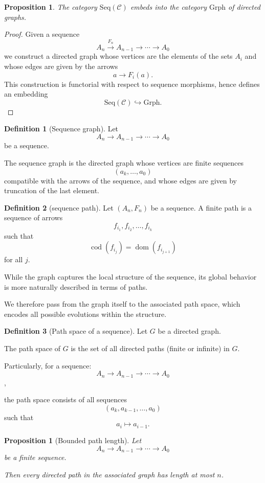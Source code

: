 \documentclass[11pt]{book}
\theoremstyle{definition}
\newtheorem{definition}{Definition}[section]
\theoremstyle{plain}
\newtheorem{proposition}[theorem]{Proposition}
\theoremstyle{remark}
\begin{document}
\begin{proposition}
The category $\mathrm{Seq}(\mathcal C)$ embeds into the category
$\mathrm{Grph}$ of directed graphs.
\end{proposition}

\begin{proof}
Given a sequence
\[
A_n \xrightarrow{F_n} A_{n-1} \to \cdots \to A_0
\]
we construct a directed graph whose vertices are the elements
of the sets $A_i$ and whose edges are given by the arrows
\[
a \to F_i(a).
\]
This construction is functorial with respect to sequence morphisms,
hence defines an embedding
\[
\mathrm{Seq}(\mathcal C) \hookrightarrow \mathrm{Grph}.
\]
\end{proof}

\begin{definition}[Sequence graph]
Let
\[
A_n \to A_{n-1} \to \cdots \to A_0
\]
be a sequence.

The sequence graph is the directed graph whose vertices
are finite sequences
\[
(a_k,\dots,a_0)
\]
compatible with the arrows of the sequence, and whose edges
are given by truncation of the last element.
\end{definition}

\begin{definition}[sequence path]
Let $(A_n,F_n)$ be a sequence.
A finite path is a sequence of arrows
\[
f_{i_1},f_{i_2},\dots,f_{i_k}
\]
such that
\[
\operatorname{cod}(f_{i_j})=\operatorname{dom}(f_{i_{j+1}})
\]
for all $j$.
\end{definition}

While the graph captures the local structure of the sequence,
its global behavior is more naturally described in terms of paths.

We therefore pass from the graph itself
to the associated path space,
which encodes all possible evolutions within the structure.

\begin{definition}[Path space of a sequence]
Let $G$ be a directed graph.

The path space of $G$ is the set of all directed paths
(finite or infinite) in $G$.

Particularly, for a sequence:
\[
A_n \to A_{n-1} \to \cdots \to A_0
\],

the path space consists of all sequences
\[
(a_k,a_{k-1},\dots,a_0)
\]
such that
\[
a_i \mapsto a_{i-1}.
\]
\end{definition}

\begin{proposition}[Bounded path length]
Let
\[
A_n \to A_{n-1} \to \cdots \to A_0
\]
be a finite sequence.

Then every directed path in the associated graph
has length at most $n$.

\end{proposition}
\end{document}
